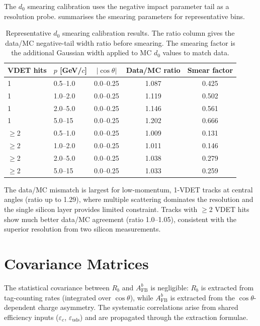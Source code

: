\documentclass[11pt,a4paper]{article}
\begin{document}
The $d_0$ smearing calibration uses the negative impact parameter
tail as a resolution probe.
 summarises the smearing parameters
for representative bins.

\begin{table}[htbp]
\centering
\caption{Representative $d_0$ smearing calibration results.
The ratio column gives the data/MC negative-tail width ratio
before smearing. The smearing factor is the additional Gaussian
width applied to MC $d_0$ values to match data.}
\label{tbl:d0_smearing_summary}
\begin{tabular}{llccc}
\toprule
VDET hits & $p$ [GeV/$c$] & $|\cos\theta|$ &
Data/MC ratio & Smear factor \\
\midrule
1 & 0.5--1.0 & 0.0--0.25 & 1.087 & 0.425 \\
1 & 1.0--2.0 & 0.0--0.25 & 1.119 & 0.502 \\
1 & 2.0--5.0 & 0.0--0.25 & 1.146 & 0.561 \\
1 & 5.0--15  & 0.0--0.25 & 1.202 & 0.666 \\
$\geq$2 & 0.5--1.0 & 0.0--0.25 & 1.009 & 0.131 \\
$\geq$2 & 1.0--2.0 & 0.0--0.25 & 1.011 & 0.146 \\
$\geq$2 & 2.0--5.0 & 0.0--0.25 & 1.038 & 0.279 \\
$\geq$2 & 5.0--15  & 0.0--0.25 & 1.033 & 0.259 \\
\bottomrule
\end{tabular}
\end{table}

The data/MC mismatch is largest for low-momentum, 1-VDET tracks at
central angles (ratio up to 1.29), where multiple scattering
dominates the resolution and the single silicon layer provides
limited constraint.
Tracks with $\geq$2 VDET hits show much better data/MC agreement
(ratio 1.0--1.05), consistent with the superior resolution from
two silicon measurements.

\section{Covariance Matrices}
\label{app:covariance}

The statistical covariance between $R_b$ and $A_\text{FB}^b$ is
negligible: $R_b$ is extracted from tag-counting rates (integrated
over $\cos\theta$), while $A_\text{FB}^b$ is extracted from the
$\cos\theta$-dependent charge asymmetry.
The systematic correlations arise from shared efficiency inputs
($\varepsilon_c$, $\varepsilon_\text{uds}$) and are propagated
through the extraction formulae.
\end{document}
